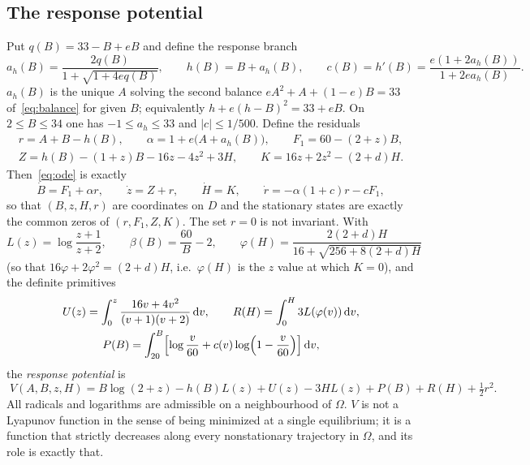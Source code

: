 \documentclass[11pt,a4paper]{article}
\theoremstyle{plain}
\theoremstyle{definition}
\theoremstyle{remark}
\newcommand{\dd}{\,\mathrm{d}}
\begin{document}
\subsection{The response potential}

Put $q(B)=33-B+eB$ and define the response branch
\begin{equation}\label{eq:responses}
a_h(B)=\frac{2q(B)}{1+\sqrt{1+4eq(B)}},\qquad h(B)=B+a_h(B),\qquad c(B)=h'(B)=\frac{e(1+2a_h(B))}{1+2ea_h(B)} .
\end{equation}
$a_h(B)$ is the unique $A$ solving the second balance $eA^2+A+(1-e)B=33$ of~\eqref{eq:balance} for given $B$; equivalently $h+e(h-B)^2=33+eB$. On $2\le B\le34$ one has $-1\le a_h\le33$ and $|c|\le1/500$. Define the residuals
\begin{equation}\label{eq:residuals}
\begin{gathered}
r=A+B-h(B),\qquad \alpha=1+e\bigl(A+a_h(B)\bigr),\qquad F_1=60-(2+z)B,\\
Z=h(B)-(1+z)B-16z-4z^2+3H,\qquad K=16z+2z^2-(2+d)H .
\end{gathered}
\end{equation}
Then~\eqref{eq:ode} is exactly
\begin{equation}\label{eq:residual-ode}
\dot B=F_1+\alpha r,\qquad \dot z=Z+r,\qquad \dot H=K,\qquad \dot r=-\alpha(1+c)r-cF_1 ,
\end{equation}
so that $(B,z,H,r)$ are coordinates on $D$ and the stationary states are exactly the common zeros of $(r,F_1,Z,K)$. The set $r=0$ is not invariant. With
\[
L(z)=\log\frac{z+1}{z+2},\qquad \beta(B)=\frac{60}{B}-2,\qquad \varphi(H)=\frac{2(2+d)H}{16+\sqrt{256+8(2+d)H}}
\]
(so that $16\varphi+2\varphi^2=(2+d)H$, i.e.\ $\varphi(H)$ is the $z$ value at which $K=0$), and the definite primitives
\begin{equation}\label{eq:primitives}
\begin{gathered}
U(z)=\int_0^z\frac{16v+4v^2}{(v+1)(v+2)}\dd v,\qquad
R(H)=\int_0^H3L(\varphi(v))\dd v,\\
P(B)=\int_{20}^B\Bigl[\log\frac v{60}+c(v)\log\Bigl(1-\frac v{60}\Bigr)\Bigr]\dd v,
\end{gathered}
\end{equation}
the \emph{response potential} is
\begin{equation}\label{eq:V}
\boxed{\;V(A,B,z,H)=B\log(2+z)-h(B)L(z)+U(z)-3HL(z)+P(B)+R(H)+\tfrac12r^2 .\;}
\end{equation}
All radicals and logarithms are admissible on a neighbourhood of $\Omega$. $V$ is not a Lyapunov function in the sense of being minimized at a single equilibrium; it is a function that strictly decreases along every nonstationary trajectory in $\Omega$, and its role is exactly that.
\end{document}
